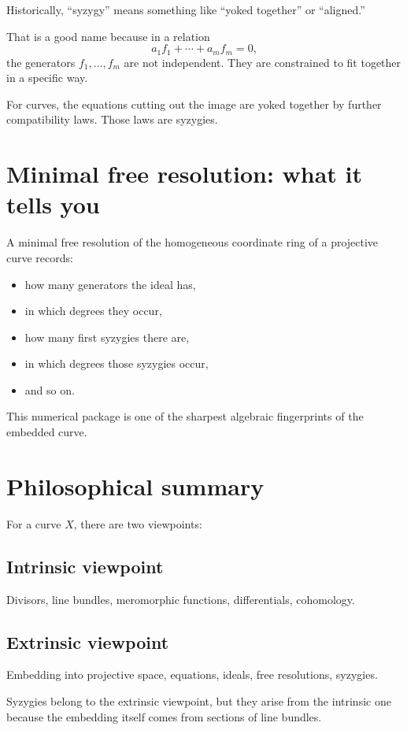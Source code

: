 \documentclass[11pt]{article}
\theoremstyle{definition}
\theoremstyle{remark}
\begin{document}
	Historically, ``syzygy'' means something like ``yoked together'' or ``aligned.''
	
	That is a good name because in a relation
	\[
	a_1f_1+\cdots+a_mf_m=0,
	\]
	the generators \(f_1,\dots,f_m\) are not independent. They are constrained to fit together in a specific way.
	
	For curves, the equations cutting out the image are yoked together by further compatibility laws. Those laws are syzygies.
	
	\section{Minimal free resolution: what it tells you}
	
	A minimal free resolution of the homogeneous coordinate ring of a projective curve records:
	
	\begin{itemize}[leftmargin=2em]
		\item how many generators the ideal has,
		\item in which degrees they occur,
		\item how many first syzygies there are,
		\item in which degrees those syzygies occur,
		\item and so on.
	\end{itemize}
	
	This numerical package is one of the sharpest algebraic fingerprints of the embedded curve.
	
	\section{Philosophical summary}
	
	For a curve \(X\), there are two viewpoints:
	
	\subsection*{Intrinsic viewpoint}
	Divisors, line bundles, meromorphic functions, differentials, cohomology.
	
	\subsection*{Extrinsic viewpoint}
	Embedding into projective space, equations, ideals, free resolutions, syzygies.
	
	Syzygies belong to the extrinsic viewpoint, but they arise from the intrinsic one because the embedding itself comes from sections of line bundles.
	
\end{document}
